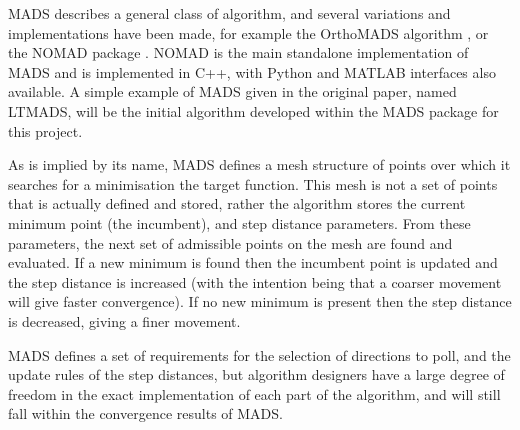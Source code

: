 MADS describes a general class of algorithm, and several variations and implementations have been made, for example the OrthoMADS algorithm \cite{Abramson2009Orthomads:Ions}, or the NOMAD package \cite{LeDigabel2011AlgorithmAlgorithm}. NOMAD is the main standalone implementation of MADS and is implemented in C++, with Python and MATLAB interfaces also available. A simple example of MADS given in the original paper, named LTMADS, will be the initial algorithm developed within the MADS package for this project. 

As is implied by its name, MADS defines a mesh structure of points over which it searches for a minimisation the target function. This mesh is not a set of points that is actually defined and stored, rather the algorithm stores the current minimum point (the incumbent), and step distance parameters. From these parameters, the next set of admissible points on the mesh are found and evaluated. If a new minimum is found then the incumbent point is updated and the step distance is increased (with the intention being that a coarser movement will give faster convergence). If no new minimum is present then the step distance is decreased, giving a finer movement.

MADS defines a set of requirements for the selection of directions to poll, and the update rules of the step distances, but algorithm designers have a large degree of freedom in the exact implementation of each part of the algorithm, and will still fall within the convergence results of MADS.


